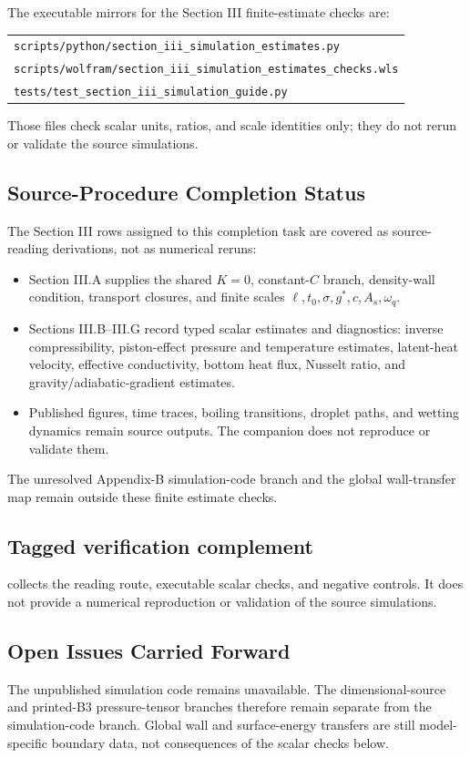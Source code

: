 The executable mirrors for the Section III finite-estimate checks are:
\begin{center}
\small
\begin{tabular}{@{}l@{}}
\texttt{scripts/python/section\_iii\_simulation\_estimates.py}\\
\texttt{scripts/wolfram/section\_iii\_simulation\_estimates\_checks.wls}\\
\texttt{tests/test\_section\_iii\_simulation\_guide.py}
\end{tabular}
\end{center}
Those files check scalar units, ratios, and scale identities only; they do not
rerun or validate the source simulations.

\subsection*{Source-Procedure Completion Status}

The Section III rows assigned to this completion task are covered as
source-reading derivations, not as numerical reruns:
\begin{itemize}
\item Section III.A supplies the shared \(K=0\), constant-\(C\) branch,
  density-wall condition, transport closures, and finite scales
  \(\ell,t_0,\sigma,g^*,c,A_s,\omega_q\).
\item Sections III.B--III.G record typed scalar estimates and diagnostics:
  inverse compressibility, piston-effect pressure and temperature estimates,
  latent-heat velocity, effective conductivity, bottom heat flux, Nusselt
  ratio, and gravity/adiabatic-gradient estimates.
\item Published figures, time traces, boiling transitions, droplet paths, and
  wetting dynamics remain source outputs.  The companion does not reproduce or
  validate them.
\end{itemize}
The unresolved Appendix-B simulation-code branch and the global wall-transfer
map remain outside these finite estimate checks.

\subsection*{Tagged verification complement}

 collects the reading
route, executable scalar checks, and negative controls. It does not provide a
numerical reproduction or validation of the source simulations.

\subsection*{Open Issues Carried Forward}

The unpublished simulation code remains unavailable.  The dimensional-source
and printed-B3 pressure-tensor branches therefore remain separate from the
simulation-code branch.  Global wall and surface-energy transfers are still
model-specific boundary data, not consequences of the scalar checks below.
